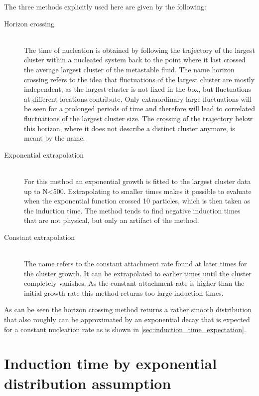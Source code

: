 The three methods explicitly used here are given by the following:
\begin{description}
\item[Horizon crossing]{\hfill \\The time of nucleation is obtained by following the trajectory of the largest cluster within a nucleated system back to the point where it last crossed the average largest cluster of the metastable fluid. The name horizon crossing refers to the idea that fluctuations of the largest cluster are mostly independent, as the largest cluster is not fixed in the box, but fluctuations at different locations contribute. Only extraordinary large fluctuations will be seen for a prolonged periods of time and therefore will lead to correlated fluctuations of the largest cluster size. The crossing of the trajectory below this horizon, where it does not describe a distinct cluster anymore, is meant by the name.}

\item[Exponential extrapolation]{\hfill \\For this method an exponential growth is fitted to the largest cluster data up to N<500. Extrapolating to smaller times makes it possible to evaluate when the exponential function crossed 10 particles, which is then taken as the induction time. The method tends to find negative induction times that are not physical, but only an artifact of the method.}

\item[Constant extrapolation]{\hfill \\The name refers to the constant attachment rate found at later times for the cluster growth. It can be extrapolated to earlier times until the cluster completely vanishes. As the constant attachment rate is higher than the initial growth rate this method returns too large induction times.}
\end{description}

As can be seen the horizon crossing method returns a rather smooth distribution that also roughly can be approximated by an exponential decay that is expected for a constant nucleation rate as is shown in \autoref{sec:induction_time_expectation}.\\


\section{Induction time by exponential distribution assumption}
\label{sec:induction_times}
\\

